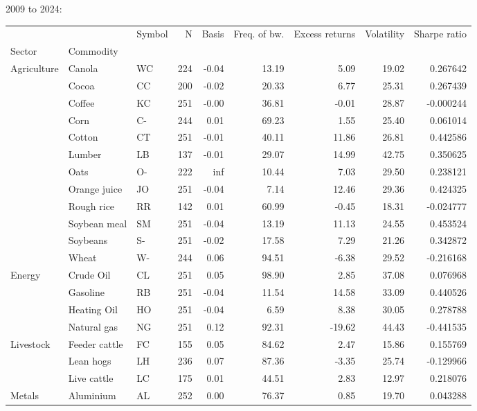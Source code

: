 \documentclass{article}
\begin{document}
\begin{adjustbox}{width=\textwidth}
2009 to 2024: \begin{tabular}{lllrrrrrr}
\toprule
 &  & Symbol & N & Basis & Freq. of bw. & Excess returns & Volatility & Sharpe ratio \\
Sector & Commodity &  &  &  &  &  &  &  \\
\midrule
\multirow[c]{12}{*}{Agriculture} & Canola & WC & 224 & -0.04 & 13.19 & 5.09 & 19.02 & 0.267642 \\
 & Cocoa & CC & 200 & -0.02 & 20.33 & 6.77 & 25.31 & 0.267439 \\
 & Coffee & KC & 251 & -0.00 & 36.81 & -0.01 & 28.87 & -0.000244 \\
 & Corn & C- & 244 & 0.01 & 69.23 & 1.55 & 25.40 & 0.061014 \\
 & Cotton & CT & 251 & -0.01 & 40.11 & 11.86 & 26.81 & 0.442586 \\
 & Lumber & LB & 137 & -0.01 & 29.07 & 14.99 & 42.75 & 0.350625 \\
 & Oats & O- & 222 & inf & 10.44 & 7.03 & 29.50 & 0.238121 \\
 & Orange juice & JO & 251 & -0.04 & 7.14 & 12.46 & 29.36 & 0.424325 \\
 & Rough rice & RR & 142 & 0.01 & 60.99 & -0.45 & 18.31 & -0.024777 \\
 & Soybean meal & SM & 251 & -0.04 & 13.19 & 11.13 & 24.55 & 0.453524 \\
 & Soybeans & S- & 251 & -0.02 & 17.58 & 7.29 & 21.26 & 0.342872 \\
 & Wheat & W- & 244 & 0.06 & 94.51 & -6.38 & 29.52 & -0.216168 \\
\multirow[c]{4}{*}{Energy} & Crude Oil & CL & 251 & 0.05 & 98.90 & 2.85 & 37.08 & 0.076968 \\
 & Gasoline & RB & 251 & -0.04 & 11.54 & 14.58 & 33.09 & 0.440526 \\
 & Heating Oil & HO & 251 & -0.04 & 6.59 & 8.38 & 30.05 & 0.278788 \\
 & Natural gas & NG & 251 & 0.12 & 92.31 & -19.62 & 44.43 & -0.441535 \\
\multirow[c]{3}{*}{Livestock} & Feeder cattle & FC & 155 & 0.05 & 84.62 & 2.47 & 15.86 & 0.155769 \\
 & Lean hogs & LH & 236 & 0.07 & 87.36 & -3.35 & 25.74 & -0.129966 \\
 & Live cattle & LC & 175 & 0.01 & 44.51 & 2.83 & 12.97 & 0.218076 \\
\multirow[c]{6}{*}{Metals} & Aluminium & AL & 252 & 0.00 & 76.37 & 0.85 & 19.70 & 0.043288 \\

\end{tabular}
\end{adjustbox}
\end{document}
